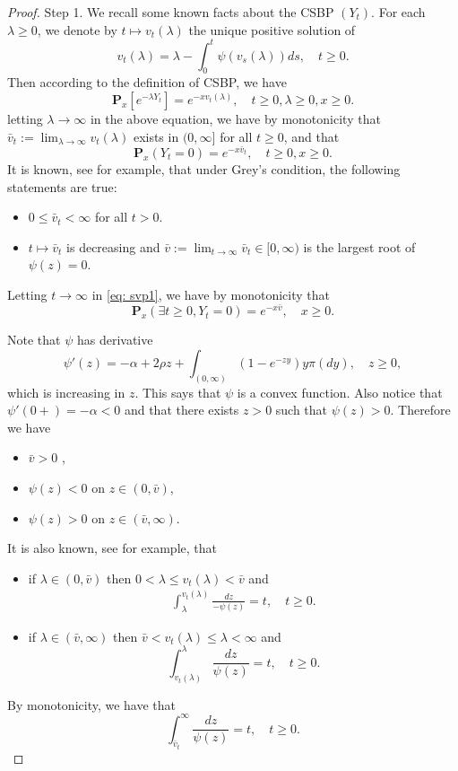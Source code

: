\documentclass[12pt,a4paper]{amsart}
\theoremstyle{plain}
\theoremstyle{definition}
\numberwithin{equation}{section}
\begin{document}
\begin{proof}
    Step 1. We recall some known facts about the CSBP $(Y_t)$.
    For each $\lambda \geq 0$, we denote by $t\mapsto v_t(\lambda)$ the unique positive solution of
\[
    v_t(\lambda)
    = \lambda - \int_0^t \psi(v_s(\lambda))ds,\quad t\geq 0.
\]
    Then according to the definition of CSBP, we have
\[
    \mathbf P_x[e^{-\lambda Y_t}] = e^{-xv_t(\lambda)}, \quad t\geq 0, \lambda \geq 0, x\geq 0.
\]
    letting $\lambda \to \infty$ in the above equation, we have by monotonicity that $\bar v_t:= \lim_{\lambda \to \infty}v_t(\lambda)$ exists in $(0,\infty]$ for all $t\geq 0$, and that
\begin{equation}
\label{eq: svp1}
    \mathbf P_x(Y_t = 0)=e^{-x\bar v_t}, \quad t\geq 0, x\ge 0.
\end{equation}
    It is known, see \cite[Theorem 3.5-3.8]{Li2011Measure-valued} for example, that under Grey's condition, the following statements are true:
\begin{itemize}
\item
    $0\leq \bar v_t < \infty$ for all $t>0$.
\item
    $t\mapsto \bar v_t$ is decreasing and $\bar v:= \lim_{t\to \infty} \bar v_t \in [0,\infty)$ is the largest root of $\psi(z) = 0$.
\end{itemize}
    Letting $t \to \infty$ in \eqref{eq: svp1}, we have by monotonicity that
\[
    \mathbf P_x(\exists t \geq 0, Y_t = 0)
    = e^{-x\bar v}, \quad x\geq 0.
\]

    Note that $\psi$ has derivative
\[
    \psi'(z)
    = -\alpha + 2\rho z + \int_{(0,\infty)}(1-e^{-zy})y\pi(dy),\quad z\geq 0,
\]
    which is increasing in $z$.
    This says that $\psi$ is a convex function.
    Also notice that $\psi'(0+)=-\alpha <0$ and that there exists $z>0$ such that $\psi(z)>0$.
    Therefore we have
\begin{itemize}
\item
    $\bar v > 0$ ,
\item
    $\psi(z) < 0$ on $z\in (0,\bar v)$,
\item
    $\psi(z) > 0 $ on $z\in (\bar v, \infty)$.
\end{itemize}
    It is also known, see \cite[Proposition 3.3]{Li2011Measure-valued} for example, that
\begin{itemize}
\item
    if $\lambda \in (0,\bar v)$ then $0<\lambda \leq v_t(\lambda)<\bar v $ and 
\begin{align}
\label{CSBP: int}
    \int_{\lambda}^{v_t(\lambda)} \frac{dz}{-\psi(z)} = t, \quad t\geq 0.
\end{align}
\item
    if $\lambda \in (\bar v, \infty)$ then $\bar v < v_t(\lambda)\leq \lambda< \infty $ and 
\[
  \int_{v_t(\lambda)}^\lambda\frac{dz}{\psi(z)} = t, \quad t\geq 0.
\]
\end{itemize}
    By monotonicity, we have that
\begin{equation}
\label{eq:svp2}
    \int_{\bar v_t}^\infty \frac{dz}{\psi(z)} = t, \quad t\geq 0.
\end{equation}


\end{proof}
\end{document}
